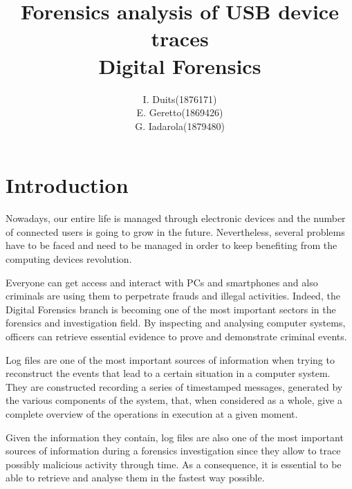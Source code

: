 \documentclass[a4paper]{article}
\title{Forensics analysis of USB device traces\\
\large Digital Forensics}
\author{
\begin{tabular}{>{\raggedleft}m{5cm}m{5cm}}
I. Duits & (1876171) \\
E. Geretto & (1869426) \\
G. Iadarola & (1879480) \\
\end{tabular}
}
\begin{document}
\maketitle


\section{Introduction}
Nowadays, our entire life is managed through electronic devices and the number of
connected users is going to grow in the future. Nevertheless, several
problems have to be faced and need to be managed in order to keep benefiting
from the computing devices revolution.

Everyone can get access and interact with PCs and smartphones and also criminals
are using them to perpetrate frauds and illegal activities. Indeed, the Digital
Forensics branch is becoming one of the most important sectors in the forensics
and investigation field. By inspecting and analysing computer systems, officers
can retrieve essential evidence to prove and demonstrate criminal events.

Log files are one of the most important sources of information when trying to
reconstruct the events that lead to a certain situation in a computer system.
They are constructed recording a series of timestamped messages, generated by
the various components of the system, that, when considered as a whole, give a
complete overview of the operations in execution at a given moment.

Given the information they contain, log files are also one of the most important
sources of information during a forensics investigation since they allow to
trace possibly malicious activity through time. As a consequence, it is
essential to be able to retrieve and analyse them in the fastest way
possible.~\cite{finlayson1987log}
\end{document}
